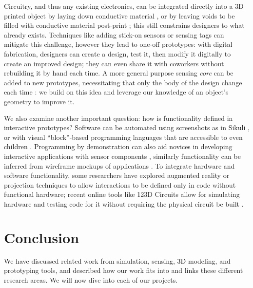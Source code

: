     Circuitry, and thus any existing electronics, can be integrated directly into a 3D printed object by laying down conductive material \cite{sells-reprap,voxel8,sarik-tracebrush}, or by leaving voids to be filled with conductive material post-print \cite{savage-sot}; this still constrains designers to what already exists. Techniques like adding stick-on sensors or sensing tags \cite{maynes-aminzade-eyepatch,yeo-stickear} can mitigate this challenge, however they lead to one-off prototypes: with digital fabrication, designers can create a design, test it, then modify it digitally to create an improved design; they can even share it with coworkers without rebuilding it by hand each time. A more general purpose sensing \emph{core} can be added to new prototypes, necessitating that only the body of the design change each time \cite{doering-composition}: we build on this idea and leverage our knowledge of an object's geometry to improve it.

    We also examine another important question: how is functionality defined in interactive prototypes? Software can be automated using screenshots as in Sikuli \cite{yeh-sikuli}, or with visual ``block''-based programming languages that are accessible to even children \cite{resnick-scratch}. Programming by demonstration can also aid novices in developing interactive applications with sensor components \cite{hartmann-dtools}, similarly functionality can be inferred from wireframe mockups of applications \cite{li-framewire}. To integrate hardware and software functionality, some researchers have explored augmented reality \cite{nam-AR} or projection \cite{akaoka-displayobjects} techniques to allow interactions to be defined only in code without functional hardware; recent online tools like 123D Circuits allow for simulating hardware and testing code for it without requiring the physical circuit be built \cite{123dcircuits}.

\section{Conclusion}

We have discussed related work from simulation, sensing, 3D modeling, and prototyping tools, and described how our work fits into and links these different research areas. We will now dive into each of our projects.
